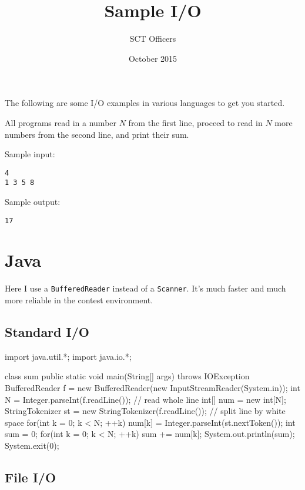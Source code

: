 \documentclass{article}
\title{Sample I/O}
\author{SCT Officers}
\date{October 2015}
\begin{document}
\maketitle

The following are some I/O examples in various languages to get you started.

All programs read in a number $N$ from the first line, proceed to read in $N$ more numbers from the second line, and print their sum.

Sample input:

\begin{verbatim}
4
1 3 5 8
\end{verbatim}

Sample output:

\begin{verbatim}
17
\end{verbatim}

\section{Java}

\lstset{language=Java}

Here I use a \texttt{BufferedReader} instead of a \texttt{Scanner}. It's much faster and much more reliable in the contest environment.

\subsection{Standard I/O}

\begin{mylstlisting}
import java.util.*;
import java.io.*;

class sum {
    public static void main(String[] args) throws IOException {
        BufferedReader f = new BufferedReader(new InputStreamReader(System.in));
	    int N = Integer.parseInt(f.readLine()); // read whole line
	    int[] num = new int[N];
	    StringTokenizer st = new StringTokenizer(f.readLine()); // split line by white space
    	for(int k = 0; k < N; ++k) {
    		num[k] = Integer.parseInt(st.nextToken());
    	}
    	int sum = 0;
    	for(int k = 0; k < N; ++k) {
    		sum += num[k];
    	}
    	System.out.println(sum);
    	System.exit(0);
    }
}
\end{mylstlisting}

\subsection{File I/O}
\end{document}
